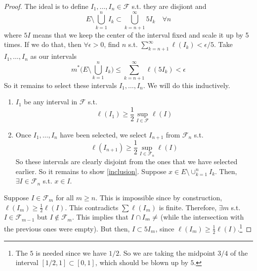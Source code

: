 \begin{proof}
    The ideal is to define $I_1, \ldots, I_n \in \mathcal{F}$ s.t. they are disjiont and 
    \begin{equation}
      E \setminus \bigcup_{k=1}^n I_k \subset \bigcup_{k=n+1}^\infty 5 I_k \quad \forall n \label{inclusion}
    \end{equation}
    where $5I$ means that we keep the center of the interval fixed and scale it up by 5 times. If we do that, then $\forall \epsilon > 0$, find $n$ s.t. $\sum_{k=n+1}^\infty \ell(I_k) < \epsilon / 5$. Take $I_1, \ldots, I_n$ as our intervals 
    \begin{equation}
      m^\ast \bigg( E \setminus \bigcup_{k=1}^n I_k \bigg) \leq \sum_{k=n+1}^\infty \ell(5 I_k) < \epsilon
    \end{equation}
    So it remains to select these intervals $I_1, \ldots, I_n$. We will do this inductively. 
    \begin{enumerate}
      \item $I_1$ be any interval in $\mathcal{F}$ s.t. 
      \begin{equation}
        \ell(I_1) \geq \frac{1}{2} \sup_{I \in \mathcal{F}} \ell(I) 
      \end{equation}

      \item Once $I_1, \ldots, I_n$ have been selected, we select $I_{n+1}$ from $\mathcal{F}_n$ s.t. 
      \begin{equation}
        \ell(I_{n+1}) \geq \frac{1}{2} \sup_{I \in \mathcal{F}_n} \ell(I)
      \end{equation}
      So these intervals are clearly disjoint from the ones that we have selected earlier. So it remains to show \ref{inclusion}. Suppose $x \in E \setminus \cup_{k=1}^n I_k$. Then, $\exists I \in \mathcal{F}_n$ s.t. $x \in I$. 
    \end{enumerate}
    Suppose $I \in \mathcal{F}_m$ for all $m \geq n$. This is impossible since by construction, $\ell(I_m) \geq \frac{1}{2} \ell(I)$. This contradicts $\sum \ell(I_m)$ is finite. Therefore, $\exists m$ s.t. $I \in \mathcal{F}_{m-1}$ but $I \not\in \mathcal{F}_m$. This implies that $I \cap I_m \neq \empty$ (while the intersection with the previous ones were empty). But then, $I \subset 5 I_m$, since $\ell(I_m) \geq \frac{1}{2} \ell(I)$.\footnote{The $5$ is needed since we have $1/2$. So we are taking the midpoint $3/4$ of the interval $[1/2, 1] \subset [0, 1]$, which should be blown up by $5$. } 
  \end{proof}

